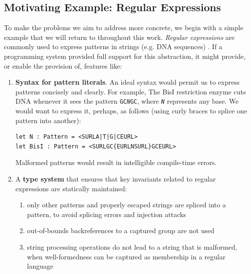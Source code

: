 \subsection{Motivating Example: Regular Expressions}\label{regex}
To make the problems we aim to address more concrete, we begin with a simple example that we will return to throughout this work. \emph{Regular expressions} are commonly used to express patterns in strings (e.g. DNA sequences) \cite{Thompson:1968:PTR:363347.363387}. If a programming system provided full support for this abstraction, it might  provide, or enable the provision of, features like:

\begin{enumerate}
\item \textbf{Syntax for pattern literals}. An ideal syntax would permit us to express patterns concisely and clearly. For example, The BisI restriction enzyme cuts DNA whenever it sees the pattern \texttt{GC\textit{N}GC}, where \texttt{\textit{N}} represents any base. We would want to express it, perhaps, as follows (using curly braces to splice one pattern into another):
\begin{lstlisting}[numbers=none]
let N : Pattern = <SURLA|T|G|CEURL>
let BisI : Pattern = <SURLGC{EURLNSURL}GCEURL>\end{lstlisting}
Malformed patterns would result in intelligible {compile-time} errors.
\item A \textbf{type system} that ensures that key invariants related to regular expressions are statically maintained:
	\begin{enumerate}
	\item only other patterns and properly escaped strings are spliced into a pattern, to avoid splicing errors and injection attacks \cite{owasp2013, Bravenboer:2007:PIA:1289971.1289975}
	\item out-of-bounds backreferences to a captured group are not used \cite{spishak2012type}
	\item string processing operations do not lead to a string that is malformed, when well-formedness can be captured as membership in a regular language \cite{fulton-thesis}
	\end{enumerate}

\end{enumerate}
